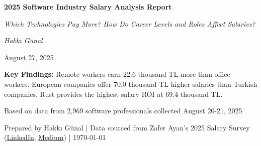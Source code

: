 \documentclass[12pt,a4paper]{article}
\begin{document}
\begin{titlepage}
    \centering
    \vspace*{1cm}
    
    
    \vspace*{2cm}
    
    \vspace{1cm}
    
    {\Huge \bfseries \color{titleblue} 2025 Software Industry Salary Analysis Report\par}
    \vspace{0.5cm}
    {\Large \itshape \color{darkgray} Which Technologies Pay More? How Do Career Levels and Roles Affect Salaries?\par}
    
    \vspace{2cm}
    
    {\Large \itshape Hakkı Günal\par}
    
    \vspace{1cm}
    
    {\large August 27, 2025\par}
    
    \vspace{2cm}
    
    {\normalsize
        \begin{minipage}{0.8\textwidth}
            \centering
            \color{darkgray}
            \textbf{Key Findings:} Remote workers earn 22.6 thousand TL more than office workers. European companies offer 70.0 thousand TL higher salaries than Turkish companies. Rust provides the highest salary ROI at 69.4 thousand TL.
        \end{minipage}
    \par}
    
    \vspace{2cm}
    
    {\normalsize \color{darkgray} Based on data from 2,969 software professionals collected August 20-21, 2025\par}
    
    \vfill
    
    {\small \color{darkgray} Prepared by Hakkı Günal | Data sourced from Zafer Ayan's 2025 Salary Survey (\href{https://www.linkedin.com/posts/zaferayan_geleneksel-maa%C5%9F-anketi-buyrun-httpslnkdin-activity-7363866008664629248-7YcQ}{LinkedIn}, \href{https://zaferayan.medium.com/2025-ağustos-detaylı-maaş-anketi-98446d71920a}{Medium}) | \today}
    
\end{titlepage}
\end{document}

